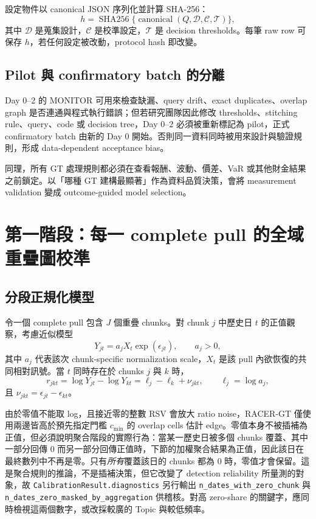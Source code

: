 \documentclass[12pt,a4paper,oneside]{article}
\begin{document}
設定物件以 canonical JSON 序列化並計算 SHA-256：
\begin{equation}
h=\operatorname{SHA256}\{\operatorname{canonical}(Q,\mathcal{D},\mathcal{C},\mathcal{T})\},
\end{equation}
其中 $\mathcal{D}$ 是蒐集設計，$\mathcal{C}$ 是校準設定，$\mathcal{T}$ 是 decision thresholds。每筆 raw row 可保存 $h$，若任何設定被改動，protocol hash 即改變。

\subsection{Pilot 與 confirmatory batch 的分離}

Day 0--2 的 MONITOR 可用來檢查缺漏、query drift、exact duplicates、overlap graph 是否連通與程式執行錯誤；但若研究團隊因此修改 thresholds、stitching rule、query、code 或 decision tree，Day 0--2 必須被重新標記為 pilot，正式 confirmatory batch 由新的 Day 0 開始。否則同一資料同時被用來設計與驗證規則，形成 data-dependent acceptance bias。

同理，所有 GT 處理規則都必須在查看報酬、波動、價差、VaR 或其他財金結果之前鎖定。以「哪種 GT 建構最顯著」作為資料品質決策，會將 measurement validation 變成 outcome-guided model selection。

\section{第一階段：每一 complete pull 的全域重疊圖校準}

\subsection{分段正規化模型}

令一個 complete pull 包含 $J$ 個重疊 chunks。對 chunk $j$ 中歷史日 $t$ 的正值觀察，考慮近似模型
\begin{equation}
Y_{jt}=a_j X_t\exp(\epsilon_{jt}),
\qquad a_j>0,
\label{eq:chunkmodel}
\end{equation}
其中 $a_j$ 代表該次 chunk-specific normalization scale，$X_t$ 是該 pull 內欲恢復的共同相對訊號。當 $t$ 同時存在於 chunks $j$ 與 $k$ 時，
\begin{equation}
r_{jkt}=\log Y_{jt}-\log Y_{kt}
=\ell_j-\ell_k+\nu_{jkt},
\qquad \ell_j=\log a_j,
\label{eq:edgeobservation}
\end{equation}
且 $\nu_{jkt}=\epsilon_{jt}-\epsilon_{kt}$。

由於零值不能取 log，且接近零的整數 RSV 會放大 ratio noise，RACER-GT 僅使用兩邊皆高於預先指定門檻 $c_{\min}$ 的 overlap cells 估計 edge。零值本身不被插補為正值，但必須說明聚合階段的實際行為：當某一歷史日被多個 chunks 覆蓋、其中一部分回傳 0 而另一部分回傳正值時，下節的加權聚合結果為正值，因此該日在最終數列中不再是零。只有\emph{所有}覆蓋該日的 chunks 都為 0 時，零值才會保留。這是聚合規則的推論，不是插補決策，但它改變了 detection reliability 所量測的對象，故 \texttt{CalibrationResult.\allowbreak diagnostics} 另行輸出 \texttt{n\_dates\_with\_zero\_chunk} 與 \texttt{n\_dates\_zero\_masked\_by\_aggregation} 供稽核。對高 zero-share 的關鍵字，應同時檢視這兩個數字，或改採較廣的 Topic 與較低頻率。
\end{document}
